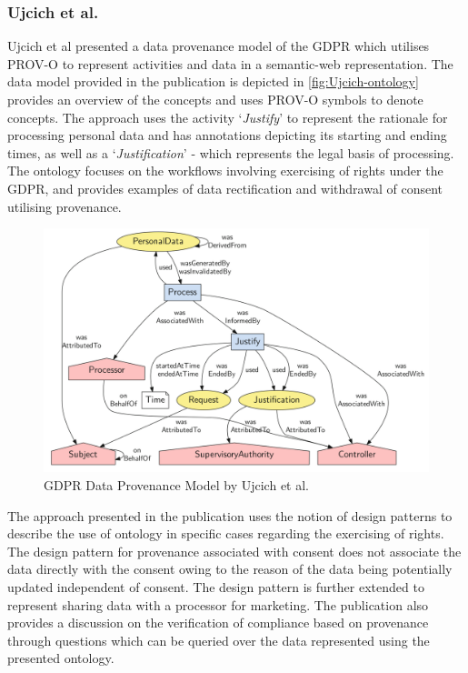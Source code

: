 \subsubsection{Ujcich et al.}\label{sec:sota:gdpr-semweb:ujcich}
Ujcich et al \cite{belhajjame_provenance_2018} presented a data provenance model of the GDPR which utilises PROV-O \cite{lebo_prov-o:_2013} to represent activities and data in a semantic-web representation.
The data model provided in the publication is depicted in \autoref{fig:Ujcich-ontology} provides an overview of the concepts and uses PROV-O \cite{lebo_prov-o:_2013} symbols to denote concepts.
The approach uses the activity `\textit{Justify}' to represent the rationale for processing personal data and has annotations depicting its starting and ending times, as well as a `\textit{Justification}' - which represents the legal basis of processing. The ontology focuses on the workflows involving exercising of rights under the GDPR, and provides examples of data rectification and withdrawal of consent utilising provenance.
\begin{figure}[htbp]
    \centering
    \includegraphics[width=\linewidth]{img/Ujcich_ontology.png}
    \caption{GDPR Data Provenance Model by Ujcich et al. \cite{belhajjame_provenance_2018}}
    \label{fig:Ujcich-ontology}
\end{figure}

The approach presented in the publication uses the notion of design patterns to describe the use of ontology in specific cases regarding the exercising of rights. The design pattern for provenance associated with consent does not associate the data directly with the consent owing to the reason of the data being potentially updated independent of consent. The design pattern is further extended to represent sharing data with a processor for marketing. The publication also provides a discussion on the verification of compliance based on provenance through questions which can be queried over the data represented using the presented ontology.


